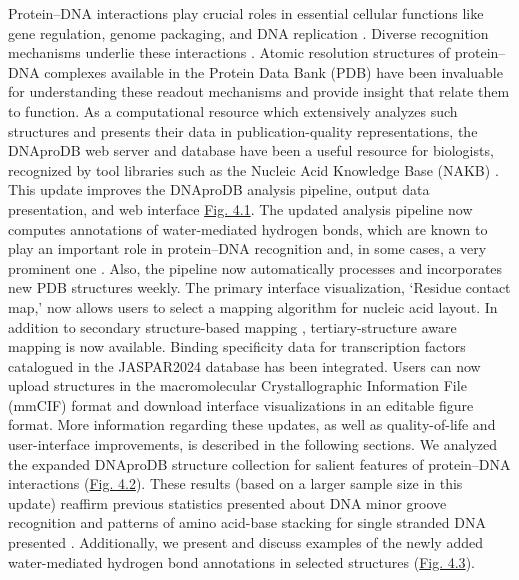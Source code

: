 Protein–DNA interactions play crucial roles in essential cellular functions like gene regulation, genome packaging, and DNA replication \citep{Spitz2012, Lai2017}. Diverse recognition mechanisms underlie these interactions \citep{rohs2009role, Rohs2010, Kitayner2010, Chiu2023}. Atomic resolution structures of protein–DNA complexes available in the Protein Data Bank (PDB) \citep{wwpdb2019protein} have been invaluable for understanding these readout mechanisms and provide insight that relate them to function. As a computational resource which extensively analyzes such structures and presents their data in publication-quality representations, the DNAproDB web server \citep{Sagendorf2017} and database \citep{Sagendorf2020} have been a useful resource for biologists, recognized by tool libraries such as the Nucleic Acid Knowledge Base (NAKB) \citep{Lawson2024}. 
This update improves the DNAproDB analysis pipeline, output data presentation, and web interface \hyperref[fig:dnaprodb1]{Fig. 4.1}. The updated analysis pipeline now computes annotations of water-mediated hydrogen bonds, which are known to play an important role \citep{Reddy2001} in protein–DNA recognition and, in some cases, a very prominent one \citep{Otwinowski1988}. Also, the pipeline now automatically processes and incorporates new PDB structures weekly. The primary interface visualization, ‘Residue contact map,’ now allows users to select a mapping algorithm for nucleic acid layout. In addition to secondary structure-based mapping \citep{Lorenz2011}, tertiary-structure aware mapping \citep{Mitra2024rnascape} is now available. Binding specificity data for transcription factors catalogued in the JASPAR2024 \citep{Rauluseviciute2024} database has been integrated. Users can now upload structures in the macromolecular Crystallographic Information File (mmCIF) format and download interface visualizations in an editable figure format. More information regarding these updates, as well as quality-of-life and user-interface improvements, is described in the following sections.
We analyzed the expanded DNAproDB structure collection for salient features of protein–DNA interactions (\hyperref[fig:dnaprodb2]{Fig. 4.2}). These results (based on a larger sample size in this update) reaffirm previous statistics presented about DNA minor groove recognition \citep{rohs2009role} and patterns of amino acid-base stacking for single stranded DNA presented \citep{Sagendorf2020}. Additionally, we present and discuss examples of the newly added water-mediated hydrogen bond annotations in selected structures (\hyperref[fig:dnaprodb3]{Fig. 4.3}).
